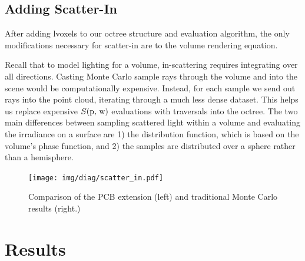 \documentclass[12pt]{ucthesis}
\newcommand{\captionfonts}{\small\bf\ssp}
\begin{document}
\section{Adding Scatter-In}
\label{scatterin_sec}
After adding lvoxels to our octree structure and evaluation algorithm, the only modifications necessary for scatter-in are to the volume rendering equation.  

Recall that to model lighting for a volume, in-scattering requires integrating over all directions.  Casting Monte Carlo sample rays through the volume and into the scene would be computationally expensive.  Instead, for each sample we send out rays into the point cloud, iterating through a much less dense dataset.  This helps us replace expensive $S(\textup{p, w})$ evaluations with traversals into the octree.  The two main differences between sampling scattered light within a volume and evaluating the irradiance on a surface are 1) the distribution function, which is based on the volume's phase function, and 2) the samples are distributed over a sphere rather than a hemisphere.

\begin{figure}[h!]
    \centering
    \texttt{[image: img/diag/scatter\_in.pdf]}
    \captionfonts
    \caption{Comparison of the PCB extension (left) and traditional Monte Carlo results (right.)}
    \label{fig:scatter_in}
\end{figure}


\chapter{Results}
\end{document}
